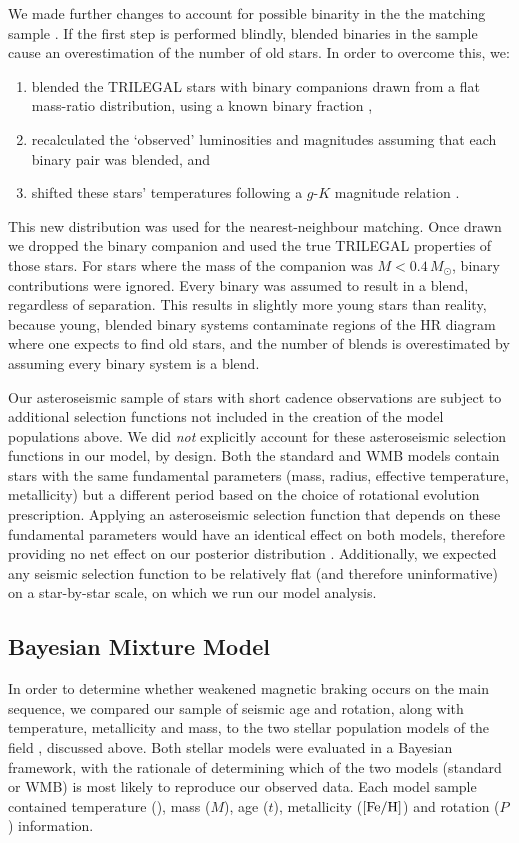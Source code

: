 We made further changes to account for possible binarity in the the matching sample \cite{berger+2020}. If the first step is performed blindly, blended binaries in the sample cause an overestimation of the number of old stars. In order to overcome this, we:

\begin{enumerate}
	\item blended the TRILEGAL stars with binary companions drawn from a flat mass-ratio distribution, using a known binary fraction \cite{raghavan+2010},
	\item recalculated the `observed' luminosities and magnitudes assuming that each binary pair was blended, and
	\item shifted these stars' temperatures following a $g$-$K$ magnitude relation \cite{berger+2020}.
\end{enumerate}

This new distribution was used for the nearest-neighbour matching. Once drawn we dropped the binary companion and used the true TRILEGAL properties of those stars. For stars where the mass of the companion was $M < 0.4\, M_\odot$, binary contributions were ignored. Every binary was assumed to result in a blend, regardless of separation. This results in slightly more young stars than reality, because young, blended binary systems contaminate regions of the HR diagram where one expects to find old stars, and the number of blends is overestimated by assuming every binary system is a blend.

Our asteroseismic sample of stars with short cadence observations are subject to additional selection functions not included in the creation of the model populations above. We did \textit{not} explicitly account for these asteroseismic selection functions in our model, by design. Both the standard and WMB models contain stars with the same fundamental parameters (mass, radius, effective temperature, metallicity) but a different period based on the choice of rotational evolution prescription. Applying an asteroseismic selection function that depends on these fundamental parameters would have an identical effect on both models, therefore providing no net effect on our posterior distribution \cite{chaplin+2011}.  Additionally, we expected any seismic selection function to be relatively flat (and therefore uninformative) on a star-by-star scale, on which we run our model analysis. 

\subsection{Bayesian Mixture Model}
In order to determine whether weakened magnetic braking occurs on the main sequence, we compared our sample of seismic age and rotation, along with temperature, metallicity and mass, to the two stellar population models of the \kepler field \cite{vansaders+2019}, discussed above. Both stellar models were evaluated in a Bayesian framework, with the rationale of determining which of the two models (standard or WMB) is most likely to reproduce our observed data. Each model sample contained temperature (\teff), mass ($M$), age ($t$), metallicity ($\rm{[Fe/H]}$) and rotation ($P$) information.

